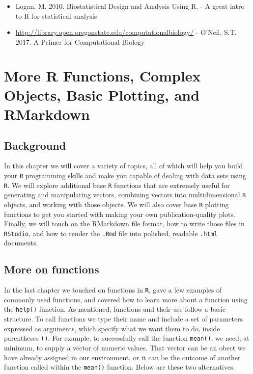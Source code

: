 \documentclass[]{book}
\begin{document}
\begin{itemize}
\item
  Logan, M. 2010. Biostatistical Design and Analysis Using R. - A great intro to R for statistical analysis
\item
  \url{http://library.open.oregonstate.edu/computationalbiology/} - O'Neil, S.T. 2017. A Primer for Computational Biology
\end{itemize}

\hypertarget{more-r-functions-complex-objects-basic-plotting-and-rmarkdown}{%
\chapter{More R Functions, Complex Objects, Basic Plotting, and RMarkdown}\label{more-r-functions-complex-objects-basic-plotting-and-rmarkdown}}

\hypertarget{background-1}{%
\section{Background}\label{background-1}}

In this chapter we will cover a variety of topics, all of which will help you build your \texttt{R} programming skills and make you capable of dealing with data sets using \texttt{R}. We will explore additional base \texttt{R} functions that are extremely useful for generating and manipulating vectors, combining vectors into multidimensional \texttt{R} objects, and working with those objects. We will also cover base \texttt{R} plotting functions to get you started with making your own publication-quality plots. Finally, we will touch on the RMarkdown file format, how to write those files in \texttt{RStudio}, and how to render the \texttt{.Rmd} file into polished, readable \texttt{.html} documents.

\hypertarget{more-on-functions}{%
\section{More on functions}\label{more-on-functions}}

In the last chapter we touched on functions in \texttt{R}, gave a few examples of commonly used functions, and covered how to learn more about a function using the \texttt{help()} function. As mentioned, functions and their use follow a basic structure. To call functions we type their name and include a set of parameters expressed as arguments, which specify what we want them to do, inside parentheses \texttt{()}. For example, to successfully call the function \texttt{mean()}, we need, at minimum, to supply a vector of numeric values. That vector can be an obect we have already assigned in our environment, or it can be the outcome of another function called within the \texttt{mean()} function. Below are these two alternatives.
\end{document}
